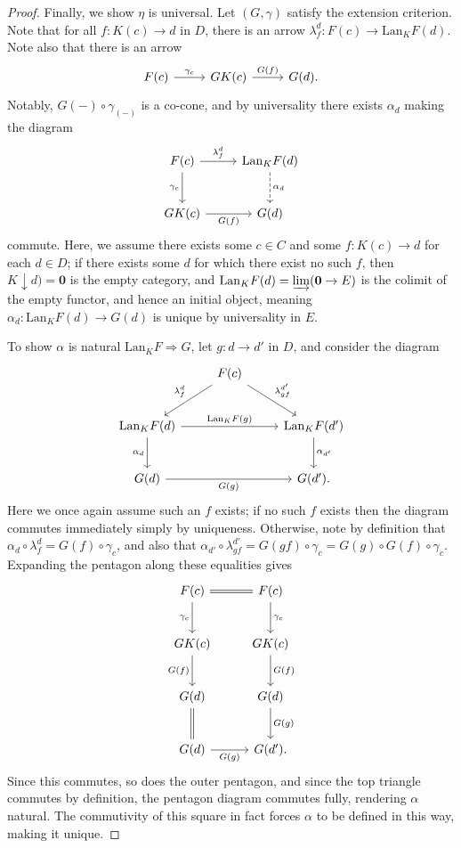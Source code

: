 \begin{proof}
	Finally, we show $\eta$ is universal. Let $(G,\gamma)$ satisfy the extension criterion. Note that for all $f : K(c) \to d$ in $D$, there is an arrow $\lambda_{f} ^d : F(c) \to \mathrm{Lan} _KF(d)$. Note also that there is an arrow
	\[\begin{tikzcd}[row sep = 2.5em, column sep = 2.5em]
	F(c)\ar[" \gamma_c ", r]  & GK(c)\ar[" G(f) ", r]  & G(d).
	\end{tikzcd}\]
	Notably, $G(-)\circ\gamma_{(-)} $ is a co-cone, and by universality there exists $\alpha_d$ making the diagram
	\[\begin{tikzcd}[row sep = 2.5em, column sep = 2.5em]
	F(c)\ar[" \lambda_{f} ^{d}  ", r] \ar[" \gamma_c "', d]  & \mathrm{Lan} _KF(d)\ar[" \alpha_d ", dashed, d]  \\
	GK(c)\ar[" G(f) "', r]  & G(d)
	\end{tikzcd}\]
	commute. Here, we assume there exists some $c\in C$ and some $f : K(c) \to d$ for each $d\in D$; if there exists some $d$ for which there exist no such $f$, then $K\downarrow d)=\mathbf{0} $ is the empty category, and $\mathrm{Lan}_KF(d)=\varinjlim (\mathbf{0} \to E)$ is the colimit of the empty functor, and hence an initial object, meaning $\alpha_d : \mathrm{Lan} _KF(d) \to G(d)$ is unique by universality in $E$.

	To show $\alpha$ is natural $\mathrm{Lan}_KF\Rightarrow G$, let $g : d \to d'$ in $D$, and consider the diagram
	\[\begin{tikzcd}[row sep = 2.5em, column sep = 2.5em]
	 & F(c)\ar[" \lambda^{d'}_{gf}  ", dr] \ar[" \lambda_f^d "', dl]  &  \\
	\mathrm{Lan} _KF(d)\ar[" \mathrm{Lan} _KF(g) ", rr] \ar[" \alpha_d "', d]  &  & \mathrm{Lan} _KF(d')\ar[" \alpha_{d'}  ", d]  \\
	G(d)\ar[" G(g) "', rr]  &  & G(d').
	\end{tikzcd}\]
	Here we once again assume such an $f$ exists; if no such $f$ exists then the diagram commutes immediately simply by uniqueness. Otherwise, note by definition that $\alpha_d \circ \lambda_f^d = G(f)\circ \gamma_c$, and also that $\alpha_{d'} \circ \lambda_{gf} ^{d'} =G(gf)\circ \gamma_c = G(g)\circ G(f)\circ \gamma_c$. Expanding the pentagon along these equalities gives
	\[\begin{tikzcd}[row sep = 2.5em, column sep = 2.5em]
	F(c)\ar[equals, r] \ar[" \gamma_c "', d]  & F(c)\ar[" \gamma_c ", d]  \\
	GK(c)\ar[" G(f) "', d]  & GK(c)\ar[" G(f) ", d]  \\
	G(d)\ar[equals, d]  & G(d)\ar[" G(g) ", d]  \\
	G(d)\ar[" G(g) "', r]  & G(d').
	\end{tikzcd}\]
	Since this commutes, so does the outer pentagon, and since the top triangle commutes by definition, the pentagon diagram commutes fully, rendering $\alpha$ natural. The commutivity of this square in fact forces $\alpha$ to be defined in this way, making it unique.


\end{proof}
